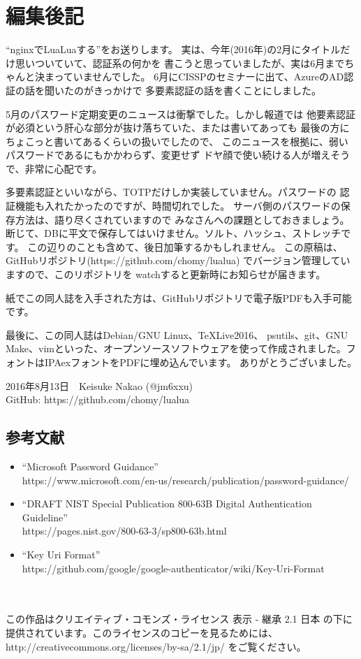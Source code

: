 \section*{編集後記}
``nginxでLuaLuaする''をお送りします。
実は、今年(2016年)の2月にタイトルだけ思いついていて、認証系の何かを
書こうと思っていましたが、実は6月までちゃんと決まっていませんでした。
6月にCISSPのセミナーに出て、AzureのAD認証の話を聞いたのがきっかけで
多要素認証の話を書くことにしました。

5月のパスワード定期変更のニュースは衝撃でした。しかし報道では
他要素認証が必須という肝心な部分が抜け落ちていた、または書いてあっても
最後の方にちょこっと書いてあるくらいの扱いでしたので、
このニュースを根拠に、弱いパスワードであるにもかかわらず、変更せず
ドヤ顔で使い続ける人が増えそうで、非常に心配です。


多要素認証といいながら、TOTPだけしか実装していません。パスワードの
認証機能も入れたかったのですが、時間切れでした。
サーバ側のパスワードの保存方法は、語り尽くされていますので
みなさんへの課題としておきましょう。
断じて、DBに平文で保存してはいけません。ソルト、ハッシュ、ストレッチです。
この辺りのことも含めて、後日加筆するかもしれません。
この原稿は、GitHubリポジトリ(https://github.com/chomy/lualua)
でバージョン管理していますので、このリポジトリを
watchすると更新時にお知らせが届きます。

紙でこの同人誌を入手された方は、GitHubリポジトリで電子版PDFも入手可能です。

最後に、この同人誌はDebian/GNU Linux、\TeX Live2016、
psutils、git、GNU Make、vimといった、オープンソースソフトウェアを使って作成されました。フォントはIPAexフォントをPDFに埋め込んでいます。
ありがとうございました。

\begin{flushright}
2016年8月13日　Keisuke Nakao (@jm6xxu)\\
GitHub: https://github.com/chomy/lualua
\end{flushright}
\subsection*{参考文献}
\begin{itemize}

\item ``Microsoft Password Guidance'' \\
https://www.microsoft.com/en-us/research/publication/password-guidance/
\item ``DRAFT NIST Special Publication 800-63B Digital Authentication Guideline''\\
https://pages.nist.gov/800-63-3/sp800-63b.html
\item ``Key Uri Format''\\
https://github.com/google/google-authenticator/wiki/Key-Uri-Format
\end{itemize}
\mbox{}\\
\vspace{48em}\\
この作品はクリエイティブ・コモンズ・ライセンス 表示 - 継承 2.1 日本 の下に提供されています。このライセンスのコピーを見るためには、http://creativecommons.org/licenses/by-sa/2.1/jp/ をご覧ください。
